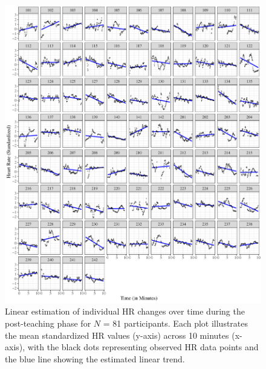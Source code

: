 \documentclass[preprint,
3p]{elsarticle} %
\begin{document}
\begin{figure}[htbp]
  \centering
  \includegraphics[width=1\textwidth]{plots_publication/plot_post_teaching_appendix.pdf}
    \caption{Linear estimation of individual HR changes over time during the post-teaching phase for $N$ = 81 participants. Each plot illustrates the mean standardized HR values (y-axis) across 10 minutes (x-axis), with the black dots representing observed HR data points and the blue line showing the estimated linear trend.}
  \label{fig.a5}
\end{figure}
\end{document}
